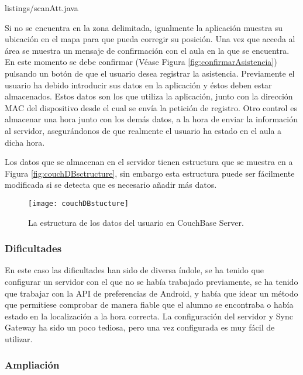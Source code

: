 
{listings/scanAtt.java} %

Si no se encuentra en la zona delimitada, igualmente la aplicación muestra su ubicación en el mapa para que pueda corregir su posición. Una vez que acceda al área se muestra un mensaje de confirmación con el aula en la que se encuentra. En este momento se debe confirmar (Véase Figura \ref{fig:confirmarAsistencia}) pulsando un botón de que el usuario desea registrar la asistencia. Previamente el usuario ha debido introducir sus datos en la aplicación y éstos deben estar almacenados. Estos datos son los que utiliza la aplicación, junto con la dirección MAC del dispositivo desde el cual se envía la petición de registro. Otro control es almacenar una hora junto con los demás datos, a la hora de enviar la información al servidor, asegurándonos de que realmente el usuario ha estado en el aula a dicha hora.


Los datos que se almacenan en el servidor tienen estructura que se muestra en a Figura \ref{fig:couchDBsctructure}, sin embargo esta estructura puede ser fácilmente modificada si se detecta que es necesario añadir más datos.

\begin{figure}[H]
	\centering
	\texttt{[image: couchDBstucture]}
	\caption{La estructura de los datos del usuario en CouchBase Server.}
	\label{fig:couchDBstucture}
\end{figure}


\subsubsection{Dificultades}

En este caso las dificultades han sido de diversa índole, se ha tenido que configurar un servidor con el que no se había trabajado previamente, se ha tenido que trabajar con la API de preferencias de Android, y había que idear un método que permitiese comprobar de manera fiable que el alumno se encontraba o había estado en la localización a la hora correcta. La configuración del servidor y Sync Gateway ha sido un poco tediosa, pero una vez configurada es muy fácil de utilizar.


\subsubsection{Ampliación}

